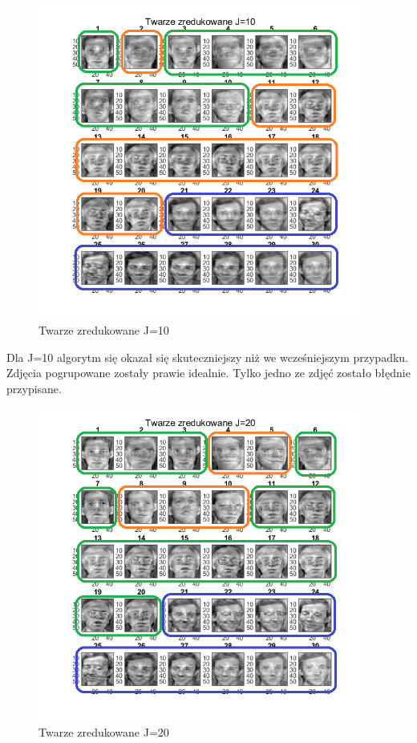 \documentclass[11pt, a4paper]{article}
\newcommand{\fbi}{\leavevmode{\parindent=1em\indent}}
\begin{document}
\begin{figure}[H]
	\centering
	\includegraphics[width=0.95\textwidth]{./assets/ilustracja_zad2_redukcja_j10.png}
	\caption{Twarze zredukowane J=10}
	\label{fig:ilustracja_zad2_redukcja_j10}
\end{figure}


\fbi
Dla J=10 algorytm się okazał się skuteczniejszy niż we wcześniejszym przypadku. Zdjęcia pogrupowane zostały prawie idealnie. Tylko jedno ze zdjęć zostało błędnie przypisane.


\begin{figure}[H]
	\centering
	\includegraphics[width=0.95\textwidth]{./assets/ilustracja_zad2_redukcja_j20.png}
	\caption{Twarze zredukowane J=20}
	\label{fig:ilustracja_zad2_redukcja_j20}
\end{figure}
\end{document}
